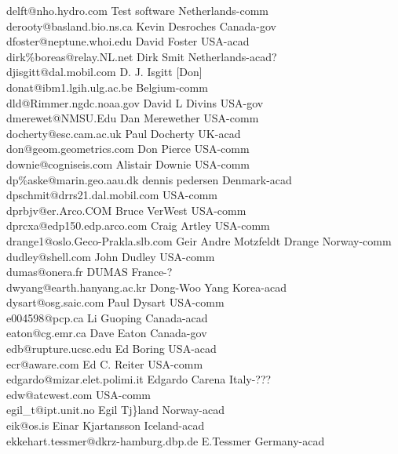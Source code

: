 \begin{tabbing}
delft@nho.hydro.com \> Test software \> Netherlands-comm\\
derooty@basland.bio.ns.ca \> Kevin Desroches \> Canada-gov\\
dfoster@neptune.whoi.edu \> David Foster \> USA-acad\\
dirk\%boreas@relay.NL.net \> Dirk Smit \> Netherlands-acad?\\
djisgitt@dal.mobil.com \> D. J. Isgitt [Don] \>\\
donat@ibm1.lgih.ulg.ac.be \> \> Belgium-comm\\
dld@Rimmer.ngdc.noaa.gov \> David L Divins \> USA-gov\\
dmerewet@NMSU.Edu \> Dan Merewether \> USA-comm\\
docherty@esc.cam.ac.uk \> Paul Docherty \> UK-acad\\
don@geom.geometrics.com \> Don Pierce \> USA-comm\\
downie@cogniseis.com \> Alistair Downie \> USA-comm\\
dp\%aske@marin.geo.aau.dk \> dennis pedersen \> Denmark-acad\\
dpschmit@drrs21.dal.mobil.com \> \> USA-comm\\
dprbjv@er.Arco.COM \> Bruce VerWest \> USA-comm\\
dprcxa@edp150.edp.arco.com \> Craig Artley \> USA-comm\\
drange1@oslo.Geco-Prakla.slb.com \> Geir Andre Motzfeldt Drange \> Norway-comm\\
dudley@shell.com \> John Dudley \> USA-comm\\
dumas@onera.fr \> DUMAS \> France-?\\
dwyang@earth.hanyang.ac.kr \> Dong-Woo Yang \> Korea-acad\\
dysart@osg.saic.com \> Paul Dysart \> USA-comm\\
e004598@pcp.ca \> Li Guoping \> Canada-acad\\
eaton@cg.emr.ca \>  Dave Eaton \>  Canada-gov\\
edb@rupture.ucsc.edu \> Ed Boring \> USA-acad\\
ecr@aware.com \> Ed C. Reiter \> USA-comm\\
edgardo@mizar.elet.polimi.it \> Edgardo Carena \> Italy-???\\
edw@atcwest.com \> \> USA-comm\\
egil\_t@ipt.unit.no \> Egil Tj\}land \> Norway-acad\\
eik@os.is \> Einar Kjartansson \> Iceland-acad\\
ekkehart.tessmer@dkrz-hamburg.dbp.de \> E.Tessmer \> Germany-acad\\

\end{tabbing}
